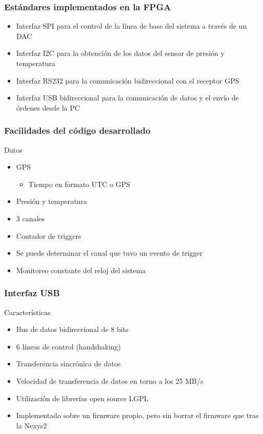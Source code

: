 \documentclass{beamer}
\begin{document}
\begin{frame}
	\frametitle{Estándares implementados en la FPGA}
		\begin{block}{}
    	\begin{itemize}
      	\item Interfaz SPI para el control de la línea 
							de base del sistema a través de un DAC 
      	\item Interfaz I2C para la obtención de los 
							datos del sensor de presión y temperatura
      	\item Interfaz RS232 para la comunicación 
							bidireccional con el receptor GPS
      	\item Interfaz USB bidireccional para la 
							comunicación de datos y el envío de 
							órdenes desde la PC
    	\end{itemize}
		\end{block}
\end{frame} 

\begin{frame}
	\frametitle{Facilidades del código desarrollado}
		\begin{block}{Datos}
    	\begin{itemize}
      	\item GPS
    		\begin{itemize}
 					\item Tiempo en formato UTC o GPS
    		\end{itemize}
      	\item Presión y temperatura
      	\item 3 canales
      	\item Contador de triggers
      	\item Se puede determinar el canal que tuvo un 
							evento de trigger
      	\item Monitoreo constante del reloj del sistema
    	\end{itemize}
		\end{block}
\end{frame} 

\begin{frame}
	\frametitle{Interfaz USB}
		\begin{block}{Características}
    	\begin{itemize}
      	\item Bus de datos bidireccional de 8 bits
 				\item 6 líneas de control (handshaking)
      	\item Transferencia sincrónica de datos
      	\item Velocidad de transferencia de datos en 
							torno a los 25 MB/s
      	\item Utilización de librerías open source LGPL
      	\item Implementado sobre un firmware propio, 
							pero sin borrar el firmware que trae la 
							Nexys2
    	\end{itemize}
		\end{block}
\end{frame} 
\end{document}

